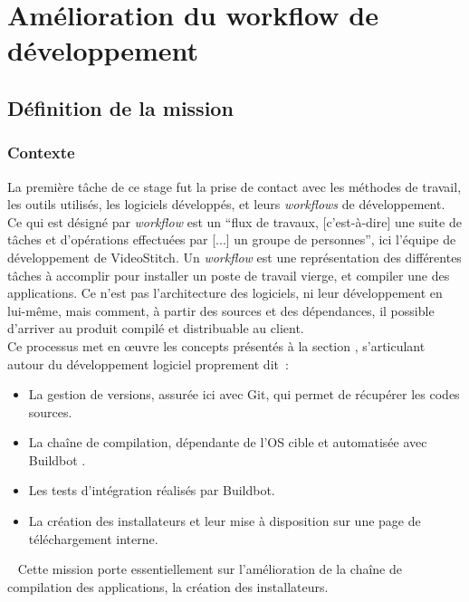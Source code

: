 \chapter{Amélioration du workflow de développement}

\section{Définition de la mission}
\subsection{Contexte}
La première tâche de ce stage fut la prise de contact avec 
les méthodes de travail, les outils utilisés, les logiciels développés, et leurs
\textit{workflows} de développement.\\
Ce qui est désigné par \textit{workflow} est un 
\enquote{flux de travaux, [c'est-à-dire] une suite de tâches et
d'opérations effectuées par [...] un groupe de personnes}\cite{workflow}, ici l'équipe de développement
de VideoStitch. Un \textit{workflow} est une représentation des différentes tâches à accomplir pour installer
un poste de travail vierge, et compiler une des applications.
Ce n'est pas l'architecture des logiciels, ni leur développement en lui-même,
mais comment, à partir des sources et des dépendances, il possible d'arriver au produit
compilé et distribuable au client.\\
Ce processus met en \oe uvre les concepts présentés à la section 
, s'articulant autour du développement
logiciel proprement dit\cite{software-build}\cite{build-automation}~:
\begin{itemize}
  \item La gestion de versions, assurée ici avec Git\cite{gestion-versions}, qui permet
  de récupérer les codes sources.
  \item La chaîne de compilation, dépendante de l'OS cible et automatisée avec Buildbot 
  \cite{chaine-compilation}\cite{integration-continue}.
  \item Les tests d'intégration\cite{integration-continue} réalisés par Buildbot.
  \item La création des installateurs et leur mise à disposition sur une page de téléchargement interne.
\end{itemize}
\ \newline
Cette mission porte essentiellement sur l'amélioration de la chaîne de compilation
des applications, la création des installateurs.


